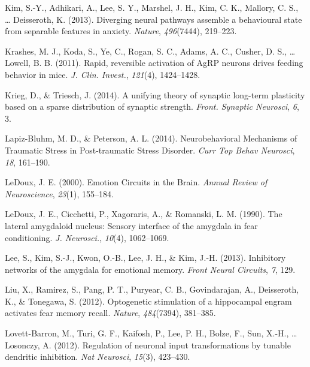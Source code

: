 \documentclass[12pt,a4paper,]{report}
\begin{document}
\hypertarget{ref-kimux5fdivergingux5f2013-1}{}
Kim, S.-Y., Adhikari, A., Lee, S. Y., Marshel, J. H., Kim, C. K.,
Mallory, C. S., \ldots{} Deisseroth, K. (2013). Diverging neural
pathways assemble a behavioural state from separable features in
anxiety. \emph{Nature}, \emph{496}(7444), 219--223.

\hypertarget{ref-krashesux5frapidux5f2011}{}
Krashes, M. J., Koda, S., Ye, C., Rogan, S. C., Adams, A. C., Cusher, D.
S., \ldots{} Lowell, B. B. (2011). Rapid, reversible activation of AgRP
neurons drives feeding behavior in mice. \emph{J. Clin. Invest.},
\emph{121}(4), 1424--1428.

\hypertarget{ref-kriegux5funifyingux5f2014-1}{}
Krieg, D., \& Triesch, J. (2014). A unifying theory of synaptic
long-term plasticity based on a sparse distribution of synaptic
strength. \emph{Front. Synaptic Neurosci}, \emph{6}, 3.

\hypertarget{ref-lapiz-bluhmux5fneurobehavioralux5f2014}{}
Lapiz-Bluhm, M. D., \& Peterson, A. L. (2014). Neurobehavioral
Mechanisms of Traumatic Stress in Post-traumatic Stress Disorder.
\emph{Curr Top Behav Neurosci}, \emph{18}, 161--190.

\hypertarget{ref-ledouxux5femotionux5f2000-1}{}
LeDoux, J. E. (2000). Emotion Circuits in the Brain. \emph{Annual Review
of Neuroscience}, \emph{23}(1), 155--184.

\hypertarget{ref-ledouxux5flateralux5f1990}{}
LeDoux, J. E., Cicchetti, P., Xagoraris, A., \& Romanski, L. M. (1990).
The lateral amygdaloid nucleus: Sensory interface of the amygdala in
fear conditioning. \emph{J. Neurosci.}, \emph{10}(4), 1062--1069.

\hypertarget{ref-leeux5finhibitoryux5f2013}{}
Lee, S., Kim, S.-J., Kwon, O.-B., Lee, J. H., \& Kim, J.-H. (2013).
Inhibitory networks of the amygdala for emotional memory. \emph{Front
Neural Circuits}, \emph{7}, 129.

\hypertarget{ref-liuux5foptogeneticux5f2012}{}
Liu, X., Ramirez, S., Pang, P. T., Puryear, C. B., Govindarajan, A.,
Deisseroth, K., \& Tonegawa, S. (2012). Optogenetic stimulation of a
hippocampal engram activates fear memory recall. \emph{Nature},
\emph{484}(7394), 381--385.

\hypertarget{ref-lovett-barronux5fregulationux5f2012}{}
Lovett-Barron, M., Turi, G. F., Kaifosh, P., Lee, P. H., Bolze, F., Sun,
X.-H., \ldots{} Losonczy, A. (2012). Regulation of neuronal input
transformations by tunable dendritic inhibition. \emph{Nat Neurosci},
\emph{15}(3), 423--430.
\end{document}

